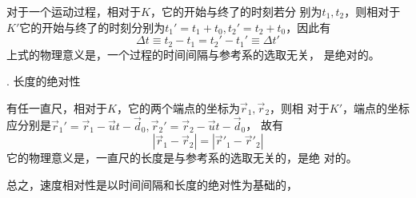 对于一个运动过程，相对于$K$，它的开始与终了的时刻若分
别为$t_1,t_2$，则相对于$K'$它的开始与终了的时刻分别为$t_1'=t_1+t_0,t_2'=t_2+t_0$，因此有
\begin{equation}\label{eqn:02.05.05}
  \Delta t \equiv t_2 - t_1 = t_2' - t_1' \equiv \Delta t'
\end{equation}
上式的物理意义是，一个过程的时间间隔与参考系的选取无关，
是绝对的。

. 长度的绝对性 \normalfont

有任一直尺，相对于$K$，它的两个端点的坐标为$\vec{r}_1,\vec{r}_2$，则相
对于$K'$，端点的坐标应分别是$\vec{r}_1' = \vec{r}_1 - \vec{u} t - \vec{d}_0,\vec{r}_2' = \vec{r}_2 - \vec{u} t - \vec{d}_0$，
故有
\begin{equation}\label{eqn:02.05.06}
  |\vec{r}_1 - \vec{r}_2| = |\vec{r}'_1 - \vec{r}'_2|
\end{equation}
它的物理意义是，一直尺的长度是与参考系的选取无关的，是绝
对的。

总之，速度相对性是以时间间隔和长度的绝对性为基础的，
